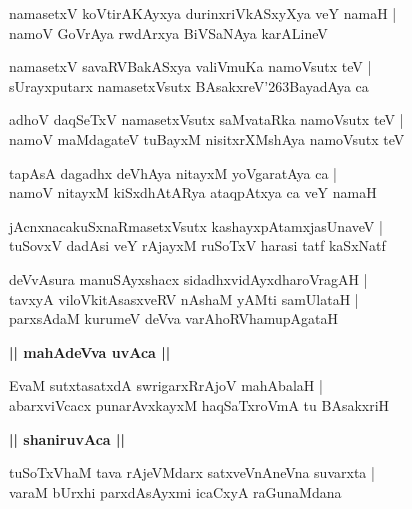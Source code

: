 \documentclass[twoside,12pt,openright]{book}
\def\S{\char'263}
\newcounter{shloka}[chapter]
\def\uvaca#1{\centerline{{\large\textbf{#1}}}}
\begin{document}
\begin{shloka}%
namasetxV koVtirAKAyxya durinxriVkASxyXya veY namaH |\\
namoV GoVrAya rwdArxya BiVSaNAya karALineV
\end{shloka}

\begin{shloka}%
namasetxV savaRVBakASxya valiVmuKa namoVsutx teV |\\
sUrayxputarx namasetxVsutx BAsakxreV\S BayadAya ca 
\end{shloka}

\begin{shloka}%
adhoV daqSeTxV namasetxVsutx saMvataRka namoVsutx teV |\\
namoV maMdagateV tuBayxM nisitxrXMshAya namoVsutx teV
\end{shloka}

\begin{shloka}%
tapAsA dagadhx deVhAya nitayxM yoVgaratAya ca |\\
namoV nitayxM kiSxdhAtARya ataqpAtxya ca veY namaH 
\end{shloka}

\begin{shloka}%
jAcnxnacakuSxnaRmasetxVsutx kashayxpAtamxjasUnaveV |\\
tuSovxV dadAsi veY rAjayxM ruSoTxV harasi tatf kaSxNatf
\end{shloka}

\begin{shloka}%
deVvAsura manuSAyxshacx sidadhxvidAyxdharoVragAH |\\
tavxyA viloVkitAsasxveRV nAshaM yAMti samUlataH |\\
parxsAdaM kurumeV deVva varAhoRVhamupAgataH
\end{shloka}

\uvaca{|| mahAdeVva uvAca ||}

\begin{shloka}%
EvaM sutxtasatxdA swrigarxRrAjoV mahAbalaH |\\
abarxviVcacx punarAvxkayxM haqSaTxroVmA tu BAsakxriH
\end{shloka}

\uvaca{|| shaniruvAca ||}

\begin{shloka}%
tuSoTxVhaM tava rAjeVMdarx satxveVnAneVna suvarxta |\\
varaM bUrxhi parxdAsAyxmi icaCxyA raGunaMdana 
\end{shloka}
\end{document}
